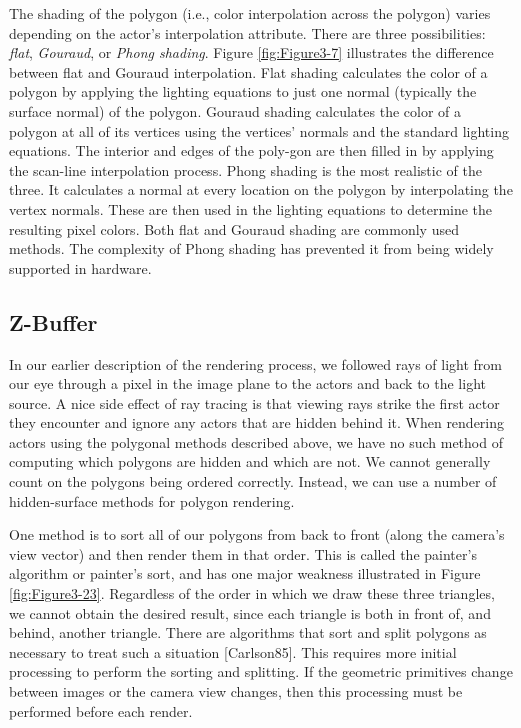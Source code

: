 The shading of the polygon (i.e., color interpolation across the polygon) varies depending on the actor's interpolation attribute. \label{subsection:rasterization.phong}
There are three possibilities: \emph{flat}, \emph{Gouraud}, or \emph{Phong shading}. Figure \ref{fig:Figure3-7} illustrates the difference between flat and Gouraud interpolation. Flat shading calculates the color of a polygon by applying the lighting equations to just one normal (typically the surface normal) of the polygon. Gouraud shading calculates the color of a polygon at all of its vertices using the vertices' normals and the standard lighting equations. The interior and edges of the poly-gon are then filled in by applying the scan-line interpolation process. Phong shading is the most realistic of the three. It calculates a normal at every location on the polygon by interpolating the vertex normals. These are then used in the lighting equations to determine the resulting pixel colors. Both flat and Gouraud shading are commonly used methods. The complexity of Phong shading has prevented it from being widely supported in hardware.

\subsection{Z-Buffer}
\label{Z-Buffer}

In our earlier description of the rendering process, we followed rays of light from our eye through a pixel in the image plane to the actors and back to the light source. A nice side effect of ray tracing is that viewing rays strike the first actor they encounter and ignore any actors that are hidden behind it. When rendering actors using the polygonal methods described above, we have no such method of computing which polygons are hidden and which are not. We cannot generally count on the polygons being ordered correctly. Instead, we can use a number of hidden-surface methods for polygon rendering.

One method is to sort all of our polygons from back to front (along the camera's view vector) and then render them in that order. This is called the painter's algorithm or painter's sort, and has one major weakness illustrated in Figure \ref{fig:Figure3-23}. Regardless of the order in which we draw these three triangles, we cannot obtain the desired result, since each triangle is both in front of, and behind, another triangle. There are algorithms that sort and split polygons as necessary to treat such a situation [Carlson85]. This requires more initial processing to perform the sorting and splitting. If the geometric primitives change between images or the camera view changes, then this processing must be performed before each render.

